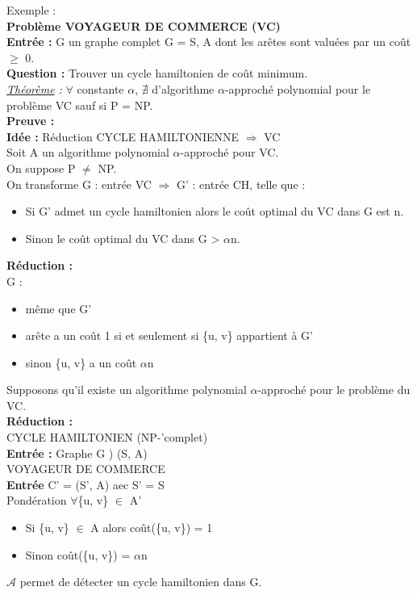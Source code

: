 \documentclass[12pt,a4paper]{article}
\newcommand\tab[1][0.65cm]{\hspace*{#1}}
\begin{document}
Exemple :\\
\textbf{\Large Problème VOYAGEUR DE COMMERCE (VC)}\\
\tab \textbf{Entrée :} G un graphe complet G = {S, A} dont les arêtes sont valuées par un coût $\geq$ 0.\\
\tab \textbf{Question :} Trouver un cycle hamiltonien de coût minimum.\\
\textit{\underline{Théorème} :} $\forall$ constante $\alpha$, $\nexists$ d'algorithme $\alpha$-approché polynomial pour le problème VC sauf si P = NP.\\
\textbf{Preuve :}\\
\textbf{Idée :} Réduction CYCLE HAMILTONIENNE $\Rightarrow$ VC\\
Soit A un algorithme polynomial $\alpha$-approché pour VC.\\
On suppose P $\neq$ NP.\\
On transforme G : entrée VC $\Rightarrow$ G' : entrée CH, telle que :
\begin{itemize}
	\item Si G' admet un cycle hamiltonien alors le coût optimal du VC dans G est n.
	\item Sinon le coût optimal du VC dans G > $\alpha$n.
\end{itemize}
\textbf{Réduction :}\\
G :
\begin{itemize}
	\item même que G'
	\item arête a un coût 1 si et seulement si \{u, v\} appartient à G'
	\item sinon \{u, v\} a un coût $\alpha$n
\end{itemize}
Supposons qu'il existe un algorithme polynomial $\alpha$-approché pour le problème du VC.\\
\textbf{Réduction :}\\
CYCLE HAMILTONIEN (NP-'complet)\\
\tab \textbf{Entrée :} Graphe G ) (S, A)\\
VOYAGEUR DE COMMERCE\\
\tab \textbf{Entrée} C' = (S', A) aec S' = S\\
Pondération $\forall$\{u, v\} $\in$ A'
\begin{itemize}
	\item Si \{u, v\} $\in$ A alors coût(\{u, v\}) = 1
	\item Sinon coût(\{u, v\}) = $\alpha$n
\end{itemize}
$\mathcal{A}$ permet de détecter un cycle hamiltonien dans G.
\end{document}
